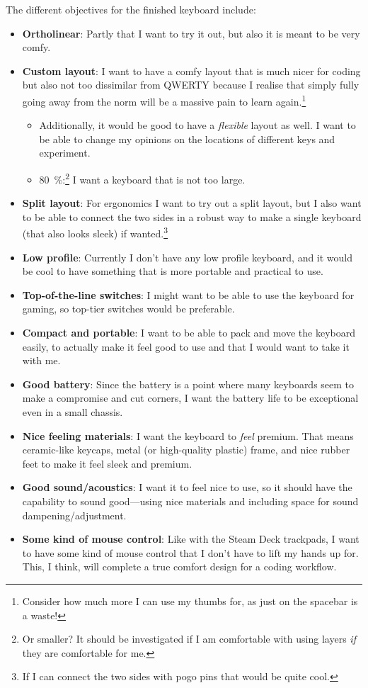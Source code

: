 \documentclass[11pt,a4paper]{article}
\numberwithin{equation}{section}
\begin{document}
The different objectives for the finished keyboard include:
\begin{itemize}
    \item \textbf{Ortholinear}: Partly that I want to try it out, but also it is meant to be very comfy.
    \item \textbf{Custom layout}: I want to have a comfy layout that is much nicer for coding but also not too dissimilar from QWERTY because I realise that simply fully going away from the norm will be a massive pain to learn again.\footnote{Consider how much more I can use my thumbs for, as just on the spacebar is a waste!}
    \begin{itemize}
        \item Additionally, it would be good to have a \textit{flexible} layout as well. I want to be able to change my opinions on the locations of different keys and experiment.
        \item \SI{80}{\percent}:\footnote{Or smaller? It should be investigated if I am comfortable with using layers \textit{if} they are comfortable for me.} I want a keyboard that is not too large.
    \end{itemize}
    \item \textbf{Split layout}: For ergonomics I want to try out a split layout, but I also want to be able to connect the two sides in a robust way to make a single keyboard (that also looks sleek) if wanted.\footnote{If I can connect the two sides with pogo pins that would be quite cool.}
    \item \textbf{Low profile}: Currently I don't have any low profile keyboard, and it would be cool to have something that is more portable and practical to use.
    \item \textbf{Top-of-the-line switches}: I might want to be able to use the keyboard for gaming, so top-tier switches would be preferable.
    \item \textbf{Compact and portable}: I want to be able to pack and move the keyboard easily, to actually make it feel good to use and that I would want to take it with me.
    \item \textbf{Good battery}: Since the battery is a point where many keyboards seem to make a compromise and cut corners, I want the battery life to be exceptional even in a small chassis.
    \item \textbf{Nice feeling materials}: I want the keyboard to \textit{feel} premium. That means ceramic-like keycaps, metal (or high-quality plastic) frame, and nice rubber feet to make it feel sleek and premium.
    \item \textbf{Good sound/acoustics}: I want it to feel nice to use, so it should have the capability to sound good---using nice materials and including space for sound dampening/adjustment.
    \item \textbf{Some kind of mouse control}: Like with the Steam Deck trackpads, I want to have some kind of mouse control that I don't have to lift my hands up for. This, I think, will complete a true comfort design for a coding workflow.
\end{itemize}
\end{document}
